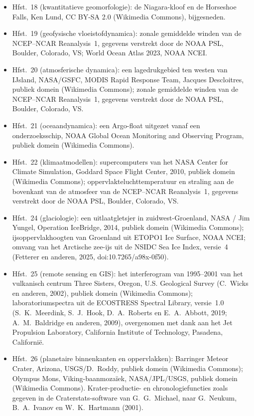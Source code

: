 \begin{itemize}
  \item Hfst.~18 (kwantitatieve geomorfologie): de Niagara-kloof en de Horseshoe Falls, Ken Lund, CC BY-SA 2.0 (Wikimedia Commons), bijgesneden.
  \item Hfst.~19 (geofysische vloeistofdynamica): zonale gemiddelde winden van de NCEP--NCAR Reanalysis~1, gegevens verstrekt door de NOAA PSL, Boulder, Colorado, VS; World Ocean Atlas 2023, NOAA NCEI.
  \item Hfst.~20 (atmosferische dynamica): een lagedrukgebied ten westen van IJsland, NASA/GSFC, MODIS Rapid Response Team, Jacques Descloitres, publiek domein (Wikimedia Commons); zonale gemiddelde winden van de NCEP--NCAR Reanalysis~1, gegevens verstrekt door de NOAA PSL, Boulder, Colorado, VS.
  \item Hfst.~21 (oceaandynamica): een Argo-float uitgezet vanaf een onderzoeksschip, NOAA Global Ocean Monitoring and Observing Program, publiek domein (Wikimedia Commons).
  \item Hfst.~22 (klimaatmodellen): supercomputers van het NASA Center for Climate Simulation, Goddard Space Flight Center, 2010, publiek domein (Wikimedia Commons); oppervlaktelucht\-temperatuur en straling aan de bovenkant van de atmosfeer van de NCEP--NCAR Reanalysis~1, gegevens verstrekt door de NOAA PSL, Boulder, Colorado, VS.
  \item Hfst.~24 (glaciologie): een uitlaatgletsjer in zuidwest-Groenland, NASA / Jim Yungel, Operation IceBridge, 2014, publiek domein (Wikimedia Commons); ijsoppervlakhoogten van Groenland uit ETOPO1 Ice Surface, NOAA NCEI; omvang van het Arctische zee-ijs uit de NSIDC Sea Ice Index, versie~4 (Fetterer en anderen, 2025, doi:10.7265/a98x-0f50).
  \item Hfst.~25 (remote sensing en GIS): het interferogram van 1995--2001 van het vulkanisch centrum Three Sisters, Oregon, U.S. Geological Survey (C.~Wicks en anderen, 2002), publiek domein (Wikimedia Commons); laboratoriumspectra uit de ECOSTRESS Spectral Library, versie~1.0 (S.~K.~Meerdink, S.~J.~Hook, D.~A.~Roberts en E.~A.~Abbott, 2019; A.~M.~Baldridge en anderen, 2009), overgenomen met dank aan het Jet Propulsion Laboratory, California Institute of Technology, Pasadena, Californië.
  \item Hfst.~26 (planetaire binnenkanten en oppervlakken): Barringer Meteor Crater, Arizona, USGS/D.~Roddy, publiek domein (Wikimedia Commons); Olympus Mons, Viking-baanmozaïek, NASA/JPL/USGS, publiek domein (Wikimedia Commons). Krater-productie- en chronologiefuncties zoals gegeven in de Craterstats-software van G.~G.~Michael, naar G.~Neukum, B.~A.~Ivanov en W.~K.~Hartmann (2001).

\end{itemize}
